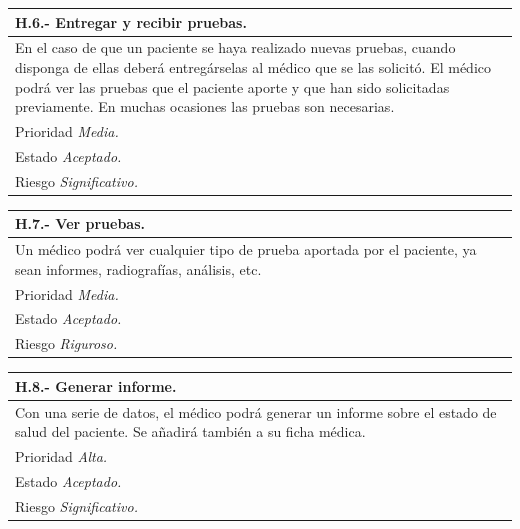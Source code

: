 \documentclass[a4paper,oneside,11pt]{book}
\begin{document}
\begin{center}
\begin{tabulary}{15cm}{|L|}
	\hline
		\bf{H.6.- Entregar y recibir pruebas.} \\
	\hline
		En el caso de que un paciente se haya realizado nuevas pruebas, cuando disponga de ellas deberá entregárselas al médico que se las solicitó. El médico podrá ver las pruebas que el paciente aporte y que han sido solicitadas previamente. En muchas ocasiones las pruebas son necesarias. \\
	\hline
		Prioridad \textit{Media.} \\
	\hline
		Estado \textit{Aceptado.} \\
	\hline
		Riesgo \textit{Significativo.} \\
	\hline
\end{tabulary}
\end{center}

\begin{center}
\begin{tabulary}{15cm}{|L|}
	\hline
		\bf{H.7.- Ver pruebas.} \\
	\hline
		Un médico podrá ver cualquier tipo de prueba aportada por el paciente, ya sean informes, radiografías, análisis, etc. \\
	\hline
		Prioridad \textit{Media.} \\
	\hline
		Estado \textit{Aceptado.} \\
	\hline
		Riesgo \textit{Riguroso.} \\
	\hline
\end{tabulary}
\end{center}

\begin{center}
\begin{tabulary}{15cm}{|L|}
	\hline
		\bf{H.8.- Generar informe.} \\
	\hline
		Con una serie de datos, el médico podrá generar un informe sobre el estado de salud del paciente. Se añadirá también a su ficha médica. \\
	\hline
		Prioridad \textit{Alta.} \\
	\hline
		Estado \textit{Aceptado.} \\
	\hline
		Riesgo \textit{Significativo.} \\
	\hline
\end{tabulary}
\end{center}
\end{document}
